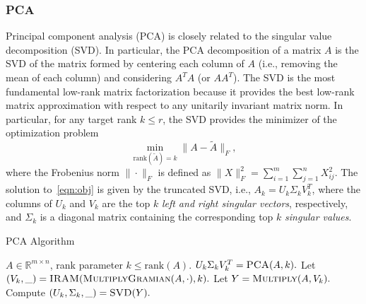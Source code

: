 \subsubsection{PCA} 
Principal component analysis (PCA) is closely related to the singular value decomposition (SVD).
In particular, the PCA decomposition of a matrix $A$ is the SVD of the matrix formed by centering each column of $A$ (i.e., removing the mean of each column) and considering $A^TA$ (or $AA^T$).
The SVD is the most fundamental low-rank matrix factorization because it provides the best low-rank matrix approximation with respect to any unitarily invariant matrix norm.
In particular, for any target rank $k \leq r$, the SVD provides the minimizer of the optimization problem
\begin{equation}
 \label{eqn:obj}
  \min_{\text{rank}(\tilde A) = k} \| A - \tilde A \|_F,
\end{equation}
where the Frobenius norm $\| \cdot \|_F$ is defined as $\|X\|_F^2 =
\sum_{i=1}^m \sum_{j=1}^n X_{ij}^2 $.
The solution
to~\eqref{eqn:obj} is given by the truncated SVD, i.e., $A_k = U_k \Sigma_k
V_k^T$, where the columns of $U_k$ and $V_k$ are the top $k$ {\it left and right singular vectors}, respectively, and $\Sigma_k$ is a 
diagonal matrix containing the corresponding top $k$ {\it singular values}.



\begin{algorithm}[tb]
    \caption{\textsc{PCA} Algorithm}
    \label{alg:pca}
    \begin{algorithmic}[1]
      \Require $A \in \mathbb{R}^{m\times n}$, rank parameter $k \leq \textrm{rank}(A).$
      \Ensure $U_k \Sigma_k V_k^T = \textsc{PCA}(A, k).$
      \State Let $(V_k, \_) = \textsc{IRAM}(\textsc{MultiplyGramian}(A, \cdot), k).$
      \State Let $Y = \textsc{Multiply}(A, V_k).$
      \State Compute $(U_k, \Sigma_k, \_) = \textsc{SVD}(Y).$
    \end{algorithmic}
  \end{algorithm}
  
